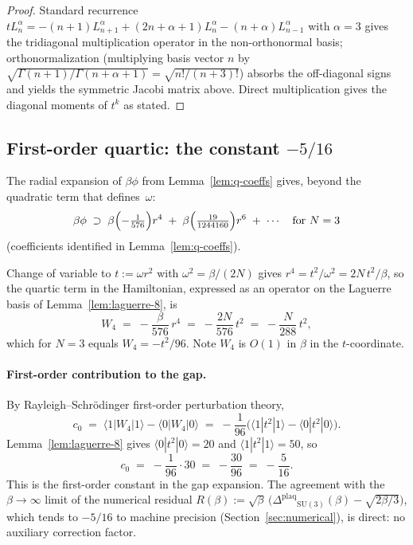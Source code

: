 \documentclass[11pt,a4paper]{article}
\theoremstyle{definition}
\newcommand{\SU}{\mathrm{SU}}
\newcommand{\Gap}{{\Delta^{\mathrm{plaq}}}}
\begin{document}
\begin{proof}
Standard recurrence $tL_n^\alpha = -(n+1)L_{n+1}^\alpha +
(2n+\alpha+1)L_n^\alpha - (n+\alpha)L_{n-1}^\alpha$ with $\alpha=3$
gives the tridiagonal multiplication operator in the
non-orthonormal basis; orthonormalization (multiplying
basis vector $n$ by $\sqrt{\Gamma(n+1)/\Gamma(n+\alpha+1)} =
\sqrt{n!/(n+3)!}$) absorbs the off-diagonal signs and yields the
symmetric Jacobi matrix above. Direct multiplication gives the
diagonal moments of $t^k$ as stated.
\end{proof}

\subsection{First-order quartic: the constant $-5/16$}\label{ssec:quartic}

The radial expansion of $\beta\phi$ from Lemma~\ref{lem:q-coeffs} gives,
beyond the quadratic term that defines~$\omega$:
\[
\beta\phi \;\supset\; \beta\Bigl(-\tfrac{1}{576}\Bigr)r^4
\;+\;\beta\Bigl(\tfrac{19}{1244160}\Bigr)r^6 \;+\;\cdots
\quad\text{for }N=3
\]
(coefficients identified in Lemma~\ref{lem:q-coeffs}).

Change of variable to $t := \omega r^2$ with $\omega^2 = \beta/(2N)$
gives $r^4 = t^2/\omega^2 = 2N\,t^2/\beta$, so the quartic term in the
Hamiltonian, expressed as an operator on the Laguerre basis of
Lemma~\ref{lem:laguerre-8}, is
\begin{equation}\label{eq:W4}
W_4 \;=\; -\frac{\beta}{576}\,r^4
\;=\; -\frac{2N}{576}\,t^2
\;=\; -\frac{N}{288}\,t^2,
\end{equation}
which for $N=3$ equals $W_4 = -t^2/96$. Note $W_4$ is $O(1)$ in $\beta$
in the $t$-coordinate.

\paragraph{First-order contribution to the gap.}
By Rayleigh--Schr\"odinger first-order perturbation theory,
\[
c_0 \;=\; \langle 1|W_4|1\rangle - \langle 0|W_4|0\rangle
\;=\; -\frac{1}{96}\bigl(\langle 1|t^2|1\rangle - \langle 0|t^2|0\rangle\bigr).
\]
Lemma~\ref{lem:laguerre-8} gives $\langle 0|t^2|0\rangle = 20$ and
$\langle 1|t^2|1\rangle = 50$, so
\begin{equation}\label{eq:c0}
c_0 \;=\; -\frac{1}{96}\cdot 30 \;=\; -\frac{30}{96} \;=\; -\frac{5}{16}.
\end{equation}
This is the first-order constant in the gap expansion. The agreement
with the $\beta\to\infty$ limit of the numerical residual
$R(\beta) := \sqrt\beta\,\bigl(\Gap_{\SU(3)}(\beta) - \sqrt{2\beta/3}\bigr)$,
which tends to $-5/16$ to machine precision (Section~\ref{sec:numerical}),
is direct: no auxiliary correction factor.
\end{document}
